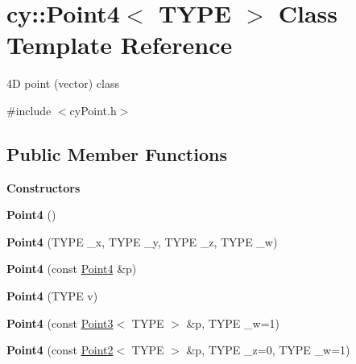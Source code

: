 \hypertarget{classcy_1_1_point4}{}\section{cy\+::Point4$<$ T\+Y\+PE $>$ Class Template Reference}
\label{classcy_1_1_point4}


4D point (vector) class  




{\ttfamily \#include $<$cy\+Point.\+h$>$}

\subsection*{Public Member Functions}
\begin{Indent}\textbf{ Constructors}\par
\begin{DoxyCompactItemize}
\item 
\mbox{\label{classcy_1_1_point4_a280496e8cf99738e029200e93168f778}} 
{\bfseries Point4} ()
\item 
\mbox{\label{classcy_1_1_point4_ab4f77aa944f2dd34e8f813409713c6a8}} 
{\bfseries Point4} (T\+Y\+PE \+\_\+x, T\+Y\+PE \+\_\+y, T\+Y\+PE \+\_\+z, T\+Y\+PE \+\_\+w)
\item 
\mbox{\label{classcy_1_1_point4_a29e0a62f6e897d3250e405fe97ed178c}} 
{\bfseries Point4} (const \mbox{\hyperlink{classcy_1_1_point4}{Point4}} \&p)
\item 
\mbox{\label{classcy_1_1_point4_a6083a0e123da87890b3cb673f0b4c3ce}} 
{\bfseries Point4} (T\+Y\+PE v)
\item 
\mbox{\label{classcy_1_1_point4_a45ad9e89774268f2d2700331b8085996}} 
{\bfseries Point4} (const \mbox{\hyperlink{classcy_1_1_point3}{Point3}}$<$ T\+Y\+PE $>$ \&p, T\+Y\+PE \+\_\+w=1)
\item 
\mbox{\label{classcy_1_1_point4_a0ca1cf042f56dfad9c02fd7a17525d4f}} 
{\bfseries Point4} (const \mbox{\hyperlink{classcy_1_1_point2}{Point2}}$<$ T\+Y\+PE $>$ \&p, T\+Y\+PE \+\_\+z=0, T\+Y\+PE \+\_\+w=1)
\item 
\mbox{\label{classcy_1_1_point4_acb7aeecd65362c4514249d8b1c7e5b3d}} 

\end{DoxyCompactItemize}
\end{Indent}
